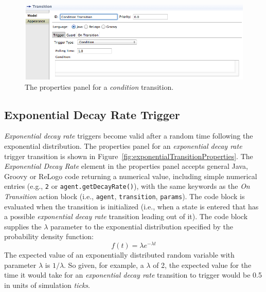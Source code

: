 \documentclass[11pt]{amsart}
\begin{document}
\begin{figure}
\begin{center}
\vspace{.2in}
\centerline {
\includegraphics[width=5in]{StatechartsImages/ConditionTransitionProperties.png}
}
\caption{The properties panel for a \emph{condition} transition.}
\label{fig:conditionTransitionProperties}
\end{center}
\end{figure}
\clearpage


\subsection{Exponential Decay Rate Trigger}
\emph{Exponential decay rate} triggers become valid after a random time following the exponential distribution. The properties panel for an \emph{exponential decay rate} trigger transition is shown in Figure~\ref{fig:exponentialTransitionProperties}. The \emph{Exponential Decay Rate} element in the properties panel accepts general Java, Groovy or ReLogo code returning a numerical value, including simple numerical entries (e.g., \texttt{2} or \texttt{agent.getDecayRate()}), with the same keywords as the \emph{On Transition} action block (i.e., \texttt{agent}, \texttt{transition}, \texttt{params}). The code block is evaluated when the transition is initialized (i.e., when a state is entered that has a possible \emph{exponential decay rate} transition leading out of it). The code block supplies the $\lambda$ parameter to the exponential distribution specified by the probability density function:
\begin{equation}
f(t) = \lambda e^{-\lambda t}
\end{equation}
The expected value of an exponentially distributed random variable with parameter $\lambda$ is $1/\lambda$. So given, for example, a $\lambda$ of 2, the expected value for the time it would take for an \emph{exponential decay rate} transition to trigger would be 0.5 in units of simulation \emph{ticks}.
\end{document}
